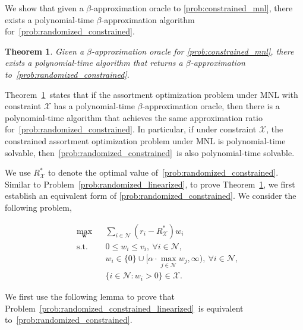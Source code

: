 \documentclass[mnsc,non-blindrev]{informs3}
\newtheorem{theorem}{Theorem}[section]
\theoremstyle{definition}
\begin{document}
We show that given a $\beta$-approximation oracle to \ref{prob:constrained_mnl}, there exists a polynomial-time $\beta$-approximation algorithm for~\ref{prob:randomized_constrained}.

\vspace{0.5em}

\begin{theorem}\label{thm:randomized_constrained}
Given a $\beta$-approximation oracle for \ref{prob:constrained_mnl}, there exists a polynomial-time algorithm that returns a $\beta$-approximation to~\ref{prob:randomized_constrained}.
\end{theorem}

\vspace{0.5em}

Theorem~\ref{thm:randomized_constrained}~states that if the assortment optimization problem under MNL with constraint $\mathcal{X}$ has a polynomial-time $\beta$-approximation oracle, then there is a polynomial-time algorithm that achieves the same approximation ratio for~\ref{prob:randomized_constrained}. In particular, if under constraint $\mathcal{X}$, the constrained assortment optimization problem under MNL is polynomial-time solvable, then~\ref{prob:randomized_constrained}~is also polynomial-time solvable.

We use $R^*_{\mathcal{X}}$ to denote the optimal value of~\ref{prob:randomized_constrained}. Similar to Problem~\eqref{prob:randomized_linearized}, to prove Theorem~\ref{thm:randomized_constrained}, we first establish an equivalent form of \ref{prob:randomized_constrained}. We consider the following problem,

\begin{equation}\label{prob:randomized_constrained_linearized}
\begin{aligned}
&\max_{\bm{w}}&&\sum_{i\in\mathcal{N}}(r_i-R^*_{\mathcal{X}})w_i\\
&\text{s.t.}&&0\leq w_i\leq v_i,\ \forall i\in\mathcal{N},\\
&&&w_i\in\{0\}\cup\Big[\alpha\cdot\max_{j\in\mathcal{N}}w_j,\infty\Big),\ \forall i\in\mathcal{N},\\
&&&\{i\in\mathcal{N}:w_i>0\}\in\mathcal{X}.
\end{aligned}
\end{equation}

We first use the following lemma to prove that Problem~\eqref{prob:randomized_constrained_linearized}~is equivalent to~\ref{prob:randomized_constrained}.

\vspace{0.5em}
\end{document}
